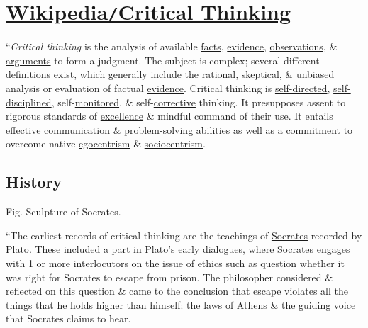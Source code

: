 \documentclass[oneside]{book}
\numberwithin{equation}{section}
\begin{document}

\section{\href{https://en.wikipedia.org/wiki/Critical_thinking}{Wikipedia\texttt{/}Critical Thinking}}
``\textit{Critical thinking} is the analysis of available \href{https://en.wikipedia.org/wiki/Fact}{facts}, \href{https://en.wikipedia.org/wiki/Evidence}{evidence}, \href{https://en.wikipedia.org/wiki/Observation}{observations}, \& \href{https://en.wikipedia.org/wiki/Argument}{arguments} to form a judgment. The subject is complex; several different \href{https://en.wikipedia.org/wiki/Critical_thinking#Definitions}{definitions} exist, which generally include the \href{https://en.wikipedia.org/wiki/Rational}{rational}, \href{https://en.wikipedia.org/wiki/Skepticism}{skeptical}, \& \href{https://en.wikipedia.org/wiki/Unbiased}{unbiased} analysis or evaluation of factual \href{https://en.wikipedia.org/wiki/Evidence}{evidence}. Critical thinking is \href{https://en.wikipedia.org/wiki/Self-directedness}{self-directed}, \href{https://en.wikipedia.org/wiki/Discipline}{self-disciplined}, self-\href{https://en.wikipedia.org/wiki/Monitoring_(medicine)}{monitored}, \& self-\href{https://en.wikipedia.org/wiki/Corrective_feedback}{corrective} thinking. It presupposes assent to rigorous standards of \href{https://en.wikipedia.org/wiki/Excellence}{excellence} \& mindful command of their use. It entails effective communication \& problem-solving abilities as well as a commitment to overcome native \href{https://en.wikipedia.org/wiki/Egocentrism}{egocentrism} \& \href{https://en.wikipedia.org/wiki/Sociocentrism}{sociocentrism}.

\subsection{History}
\textsf{Fig. Sculpture of Socrates.}

``The earliest records of critical thinking are the teachings of \href{https://en.wikipedia.org/wiki/Socrates}{Socrates} recorded by \href{https://en.wikipedia.org/wiki/Plato}{Plato}. These included a part in Plato's early dialogues, where Socrates engages with 1 or more interlocutors on the issue of ethics such as question whether it was right for Socrates to escape from prison. The philosopher considered \& reflected on  this question \& came to the conclusion that escape violates all the things that he holds higher than himself: the laws of Athens \& the guiding voice that Socrates claims to hear.
\end{document}
